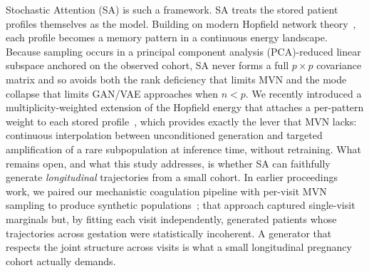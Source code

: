 Stochastic Attention (SA) is such a framework.  SA treats the stored patient
profiles themselves as the model. Building on modern Hopfield network
theory~\citep{Ramsauer2021}, each profile becomes a memory pattern in a
continuous energy landscape. Because sampling occurs in a
principal component analysis (PCA)-reduced linear subspace anchored on the observed cohort, SA never forms a
full $p \times p$ covariance matrix and so avoids both the rank deficiency that
limits MVN and the mode collapse that limits GAN/VAE approaches when $n < p$.
We recently introduced a multiplicity-weighted extension of the Hopfield energy
that attaches a per-pattern weight to each stored profile~\citep{Varner2026Multiplicity},
which provides exactly the lever that MVN lacks: continuous interpolation
between unconditioned generation and targeted amplification of a rare
subpopulation at inference time, without retraining. What remains open, and what
this study addresses, is whether SA can faithfully generate \emph{longitudinal}
trajectories from a small cohort. In earlier proceedings work, we paired our
mechanistic coagulation pipeline with per-visit MVN sampling to produce
synthetic populations~\citep{Varner2023JuliaCon}; that approach captured
single-visit marginals but, by fitting each visit independently, generated
patients whose trajectories across gestation were statistically incoherent. A
generator that respects the joint structure across visits is what a small
longitudinal pregnancy cohort actually demands.

